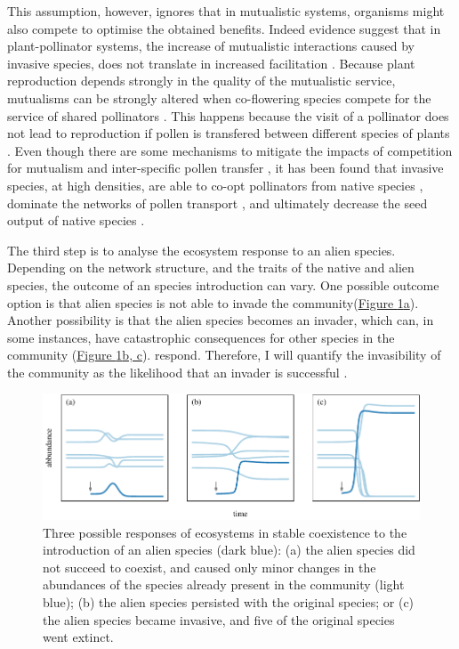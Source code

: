 \documentclass[a4paper]{article}
\begin{document}
This assumption, however, ignores that in mutualistic systems, organisms might also compete to optimise the obtained benefits.
Indeed evidence suggest that in plant-pollinator systems, the increase of mutualistic interactions caused by invasive species, does not translate in increased facilitation \cite{Lopezaraiza-Mikel2007}.
Because plant reproduction depends strongly in the quality of the mutualistic service, mutualisms can be strongly altered when co-flowering species compete for the service of shared pollinators \cite{Sargent2008, Mitchell2009}.
This happens because the visit of a pollinator does not lead to reproduction if pollen is transfered between different species of plants \cite{Morales2008}.
Even though there are some mechanisms to mitigate the impacts of competition for mutualism and inter-specific pollen transfer \cite{Ghazoul2006, Bartomeus2008a}, it has been found that invasive species, at high densities, are able to co-opt pollinators from native species \cite{Pysek2011}, dominate the networks of pollen transport \cite{Lopezaraiza-Mikel2007, Alarcon2010}, and ultimately decrease the seed output of native species \cite{Munoz2008}.

The third step is to analyse the ecosystem response to an alien species.
Depending on the network structure, and the traits of the native and alien species, the outcome of an species introduction can vary.
One possible outcome option is that alien species is not able to invade the community(\hyperref[fig:dynamics]{Figure \ref{fig:dynamics}a}).
Another possibility is that the alien species becomes an invader, which can, in some instances, have catastrophic consequences for other species in the community (\hyperref[fig:dynamics]{Figure \ref{fig:dynamics}b, c}).
respond.
Therefore, I will quantify the invasibility of the community as the likelihood that an invader is successful \cite{Ives2007, Romanuk2009}.

\begin{figure}[tbp]
  \includegraphics{dynamics}
  \caption{
  \label{fig:dynamics}
  Three possible responses of ecosystems in stable coexistence to the introduction of an alien species (dark blue):
  (a) the alien species did not succeed to coexist, and caused only minor changes in the abundances of the species already present in the community (light blue);
  (b) the alien species persisted with the original species; or
  (c) the alien species became invasive, and five of the original species went extinct.
  }
\end{figure}
\end{document}
